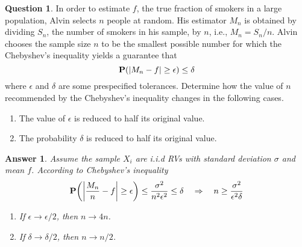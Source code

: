 \documentclass[utf8]{article}
\theoremstyle{definition}%
\newtheorem{question}{Question} %
\theoremstyle{plain}%
\newtheorem{answer}{Answer} %
\begin{document}
\begin{question}
    In order to estimate $f$, the true fraction of smokers in a large population, Alvin selects $n$ people at random. His estimator $M_n$ is obtained by dividing $S_n$, the number of smokers in his sample, by $n$, i.e., $M_n = S_n / n$. Alvin chooses the sample size $n$ to be the smallest possible number for which the Chebyshev's inequality yields a guarantee that
    \begin{equation}
        \mathbf{P}(\abs{M_n - f} \geq \epsilon) \leq \delta
    \end{equation}
    where $\epsilon$ and $\delta$ are some prespecified tolerances. Determine how the value of $n$ recommended by the Chebyshev's inequality changes in the following cases.
    \begin{enumerate}[label=(\alph*)]
        \item The value of $\epsilon$ is reduced to half its original value.
        \item The probability $\delta$ is reduced to half its original value.
    \end{enumerate}
\end{question}
\begin{answer}
    Assume the sample $X_i$ are i.i.d RVs with standard deviation $\sigma$ and mean $f$. According to Chebyshev's inequality
    \begin{equation}
        \mathbf{P}\qty(\abs{\frac{M_n}{n} - f} \geq \epsilon) \leq \frac{\sigma^2}{n^2 \epsilon^2} \leq \delta \quad\Rightarrow\quad n \geq \frac{\sigma^2}{\epsilon^2 \delta}
    \end{equation}
    \begin{enumerate}[label=(\alph*)]
        \item If $\epsilon \to \epsilon / 2$, then $n \to 4n$.
        \item If $\delta \to \delta / 2$, then $n \to n/2$.
    \end{enumerate}
\end{answer}
\end{document}
